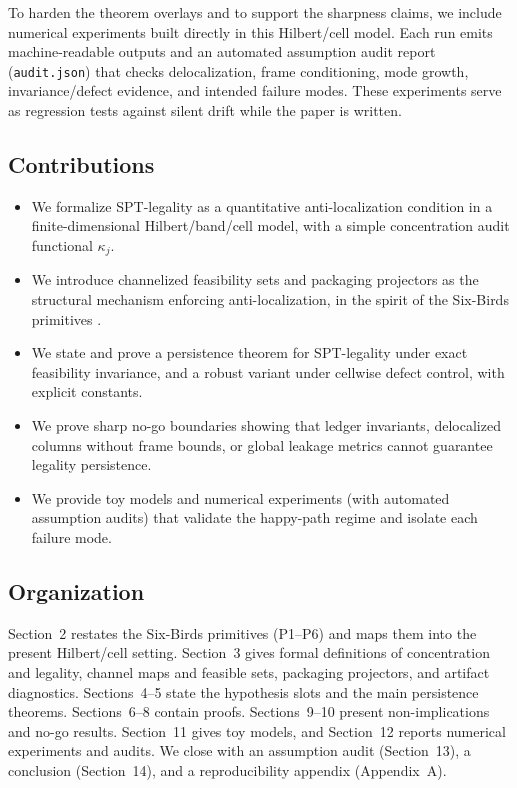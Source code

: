 \documentclass[11pt]{article}
\begin{document}
To harden the theorem overlays and to support the sharpness claims, we include numerical experiments built directly in this Hilbert/cell model.
Each run emits machine-readable outputs and an automated assumption audit report (\texttt{audit.json}) that checks delocalization, frame conditioning, mode growth, invariance/defect evidence, and intended failure modes.
These experiments serve as regression tests against silent drift while the paper is written.

\subsection{Contributions}

\begin{itemize}
\item We formalize SPT-legality as a quantitative anti-localization condition in a finite-dimensional Hilbert/band/cell model, with a simple concentration audit functional $\kappa_j$.
\item We introduce channelized feasibility sets and packaging projectors as the structural mechanism enforcing anti-localization, in the spirit of the Six-Birds primitives \cite{Tsiokos2026SixBirds}.
\item We state and prove a persistence theorem for SPT-legality under exact feasibility invariance, and a robust variant under cellwise defect control, with explicit constants.
\item We prove sharp no-go boundaries showing that ledger invariants, delocalized columns without frame bounds, or global leakage metrics cannot guarantee legality persistence.
\item We provide toy models and numerical experiments (with automated assumption audits) that validate the happy-path regime and isolate each failure mode.
\end{itemize}

\subsection{Organization}

Section~2 restates the Six-Birds primitives (P1--P6) and maps them into the present Hilbert/cell setting.
Section~3 gives formal definitions of concentration and legality, channel maps and feasible sets, packaging projectors, and artifact diagnostics.
Sections~4--5 state the hypothesis slots and the main persistence theorems.
Sections~6--8 contain proofs.
Sections~9--10 present non-implications and no-go results.
Section~11 gives toy models, and Section~12 reports numerical experiments and audits.
We close with an assumption audit (Section~13), a conclusion (Section~14), and a reproducibility appendix (Appendix~A).
\end{document}

